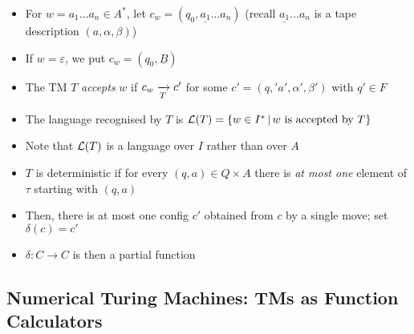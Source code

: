\begin{itemize}
	
	\item For $ w = a_1 \dots a_n \in A^* $, let $ c_w = (q_0, \underline{a_1} \dots a_n) $ (recall $ \underline{a_1} \dots a_n $ is a tape description $ (a, \alpha, \beta) $)
	
	\item If $ w = \varepsilon $, we put $ c_w = (q_0, \underline{B}) $
	
	\item The TM $ T $ \textit{accepts} $ w $ if $ c_w \xrightarrow[T]{} c' $ for some $ c' = (q, 'a', \alpha', \beta') $ with $ q' \in F $
	
	\item The language recognised by $ T $ is $ \mathcal{L}(T) = \left\lbrace w \in I^* \, | \, w \text{ is accepted by } T  \right\rbrace $
	
	\item Note that $ \mathcal{L}(T) $ is a language over $ I $ rather than over $ A $
	
	\item $ T $ is deterministic if for every $ (q, a) \in Q \times A $ there is \textit{at most one} element of $ \tau $ starting with $ (q, a) $
	
	\item Then, there is at most one config $ c' $ obtained from $ c $ by a single move; set $ \delta(c) = c' $
	
	\item $ \delta: C \to C $ is then a partial function
	
\end{itemize}

\clearpage

\subsection{Numerical Turing Machines: TMs as Function Calculators}

